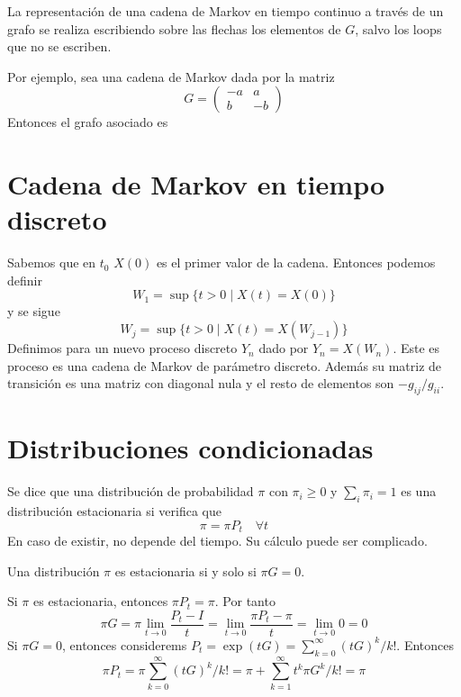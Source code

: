 \documentclass[PREyA.tex]{subfiles}
\begin{document}
\begin{nota}
La representación de una cadena de Markov en tiempo continuo a través de un grafo se realiza escribiendo sobre las flechas los elementos de $G$, salvo los loops que no se escriben. 

Por ejemplo, sea una cadena de Markov dada por la matriz
$$
G= 
\begin{pmatrix}
-a & a\\
b & -b
\end{pmatrix}
$$
Entonces el grafo asociado es
\begin{center}
\end{center}
\end{nota}

\section{Cadena de Markov en tiempo discreto}
Sabemos que en $t_0$ $X(0)$ es el primer valor de la cadena. Entonces podemos definir 
$$
W_1 = \sup\{t>0 \mid X(t)=X(0)\}
$$
y se sigue
$$
W_j = \sup\{t>0\mid X(t) = X(W_{j-1})\}
$$
Definimos para un nuevo proceso discreto $Y_n$ dado por $Y_n = X(W_n)$. Este es proceso es una cadena de Markov de parámetro discreto. Además su matriz de transición es una matriz con diagonal nula y el resto de elementos son $-g_{ij}/g_{ii}$. 
\section{Distribuciones condicionadas}
\begin{defi}
Se dice que una distribución de probabilidad $\pi$ con $\pi_i \geq 0$ y $\sum_i \pi_i = 1$ es una distribución estacionaria si verifica que
$$
\pi = \pi P_t \quad \forall t
$$
En caso de existir, no depende del tiempo. Su cálculo puede ser complicado.
\end{defi}
\begin{prop}
Una distribución $\pi$ es estacionaria si y solo si $\pi G = 0$.
\end{prop}
\begin{dem}
Si $\pi$ es estacionaria, entonces $\pi P_t = \pi$. Por tanto
$$
\pi G = \pi \lim_{t\to 0} \frac{P_t - I}{t} = \lim_{t\to 0} \frac{\pi P_t - \pi}{t} = \lim_{t\to 0} 0 = 0
$$
Si $\pi G = 0$, entonces considerems $P_t = \exp(tG) = \sum_{k=0}^\infty (tG)^k/k!$. Entonces
$$
\pi P_t = \pi  \sum_{k=0}^\infty (tG)^k/k! = \pi +  \sum_{k=1}^\infty t^k\pi G^k/k! = \pi
$$
\end{dem}
\end{document}
